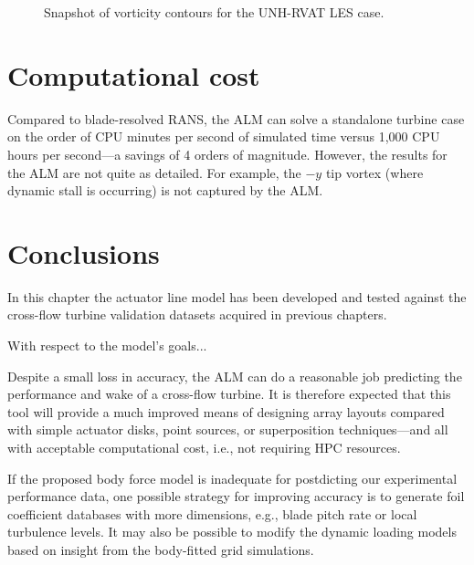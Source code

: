 \begin{figure}
    \caption{Snapshot of vorticity contours for the UNH-RVAT LES case.}
    
    \label{RVAT-LES}
\end{figure}




\section{Computational cost}


Compared to blade-resolved RANS, the ALM can solve a standalone turbine case on
the order of CPU minutes per second of simulated time versus 1,000 CPU hours per
second---a savings of 4 orders of magnitude. However, the results for the ALM
are not quite as detailed. For example, the $-y$ tip vortex (where dynamic stall
is occurring) is not captured by the ALM.


\section{Conclusions}

In this chapter the actuator line model has been developed and tested against
the cross-flow turbine validation datasets acquired in previous chapters.

With respect to the model's goals...

Despite a small loss in accuracy, the ALM can do a reasonable job predicting the
performance and wake of a cross-flow turbine. It is therefore expected that this
tool will provide a much improved means of designing array layouts compared with
simple actuator disks, point sources, or superposition techniques---and all with
acceptable computational cost, i.e., not requiring HPC resources.


If the proposed body force model is inadequate for postdicting our experimental
performance data, one possible strategy for improving accuracy is to generate
foil coefficient databases with more dimensions, e.g., blade pitch rate or local
turbulence levels. It may also be possible to modify the dynamic loading models
based on insight from the body-fitted grid simulations.


